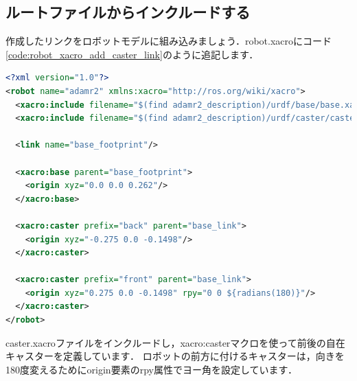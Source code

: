 \documentclass[{../../master}]{subfiles}
\begin{document}
\subsection{ルートファイルからインクルードする}

作成したリンクをロボットモデルに組み込みましょう．\textsf{robot.xacro}にコード\ref{code:robot_xacro_add_caster_link}のように追記します．

\begin{lstlisting}[language=XML, label=code:robot_xacro_add_caster_link, caption=Add Caster-Link to Robot Model]
<?xml version="1.0"?>
<robot name="adamr2" xmlns:xacro="http://ros.org/wiki/xacro">
  <xacro:include filename="$(find adamr2_description)/urdf/base/base.xacro"/>
  <xacro:include filename="$(find adamr2_description)/urdf/caster/caster.xacro"/>

  <link name="base_footprint"/>

  <xacro:base parent="base_footprint">
    <origin xyz="0.0 0.0 0.262"/>
  </xacro:base>

  <xacro:caster prefix="back" parent="base_link">
    <origin xyz="-0.275 0.0 -0.1498"/>
  </xacro:caster>

  <xacro:caster prefix="front" parent="base_link">
    <origin xyz="0.275 0.0 -0.1498" rpy="0 0 ${radians(180)}"/>
  </xacro:caster>
</robot>
\end{lstlisting}

\textsf{caster.xacro}ファイルをインクルードし，\textsf{xacro:caster}マクロを使って前後の自在キャスターを定義しています．
ロボットの前方に付けるキャスターは，向きを180度変えるために\textsf{origin}要素の\textsf{rpy}属性でヨー角を設定しています．
\end{document}
